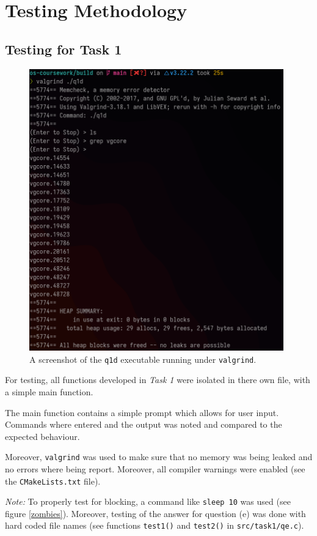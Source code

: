 \documentclass[12pt]{article}
\begin{document}
\section{Testing Methodology}

\subsection{Testing for Task 1}

\begin{figure}[H]
\centering
\includegraphics[width=11cm]{q1d-test}
\caption{A screenshot of the \texttt{q1d} executable running
under \texttt{valgrind}.}
\end{figure}

For testing, all functions developed in \textit{Task 1} were
isolated in there own file, with a simple main function.

The main function contains a simple prompt which allows for
user input. Commands where entered and the output was noted and
compared to the expected behaviour.

Moreover, \texttt{valgrind} was used to make sure that no memory
was being leaked and no errors where being report. Moreover, all
compiler warnings were enabled (see the \texttt{CMakeLists.txt}
file).

\textit{Note:} To properly test for blocking, a command like
\texttt{sleep 10} was used (see figure \ref{zombies}). Moreover,
testing of the answer for question (e) was done with hard coded
file names (see functions \texttt{test1()} and \texttt{test2()}
in \texttt{src/task1/qe.c}).
\end{document}
